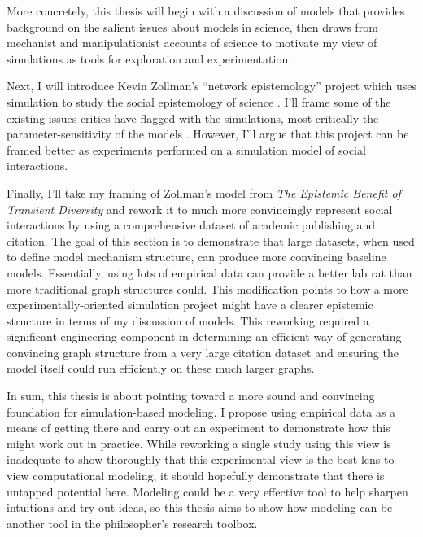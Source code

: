 More concretely, this thesis will begin with a discussion of models that
provides background on the salient issues about models in science, then
draws from mechanist and manipulationist accounts of science to motivate
my view of simulations as tools for exploration and experimentation.

Next, I will introduce Kevin Zollman's ``network epistemology'' project
which uses simulation to study the social epistemology of science
\autocite{zollmanNetworkEpistemologyCommunication2013,zollmanEpistemicBenefitTransient2009}.
I'll frame some of the existing issues critics have flagged with the
simulations, most critically the parameter-sensitivity of the models
\autocite{rosenstockEpistemicNetworksLess2017a}. However, I'll argue
that this project can be framed better as experiments performed on a
simulation model of social interactions.

Finally, I'll take my framing of Zollman's model from \emph{The
Epistemic Benefit of Transient Diversity} and rework it to much more
convincingly represent social interactions by using a comprehensive
dataset of academic publishing and citation. The goal of this section is
to demonstrate that large datasets, when used to define model mechanism
structure, can produce more convincing baseline models. Essentially,
using lots of empirical data can provide a better lab rat than more
traditional graph structures could. This modification points to how a
more experimentally-oriented simulation project might have a clearer
epistemic structure in terms of my discussion of models. This reworking
required a significant engineering component in determining an efficient
way of generating convincing graph structure from a very large citation
dataset and ensuring the model itself could run efficiently on these
much larger graphs.

In sum, this thesis is about pointing toward a more sound and convincing
foundation for simulation-based modeling. I propose using empirical data
as a means of getting there and carry out an experiment to demonstrate
how this might work out in practice. While reworking a single study
using this view is inadequate to show thoroughly that this experimental
view is the best lens to view computational modeling, it should
hopefully demonstrate that there is untapped potential here. Modeling
could be a very effective tool to help sharpen intuitions and try out
ideas, so this thesis aims to show how modeling can be another tool in
the philosopher's research toolbox.
